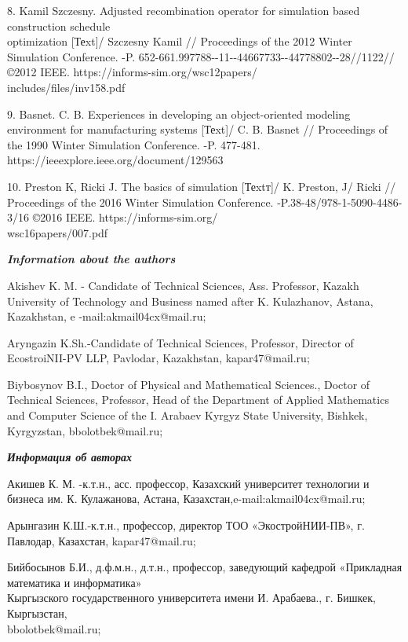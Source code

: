 \begin{noparindent}
8. Kamil Szczesny. Adjusted recombination operator for simulation based
construction schedule \\optimization {[}Теxt{]}/ Szczesny Kamil //
Proceedings of the 2012 Winter Simulation Conference. -P.
652-661.997788-\/-11-\/-44667733-\/-44778802-\/-28//1122//©2012 IEEE.
https://informs-sim.org/wsc12papers/\\includes/files/inv158.pdf

9. Basnet. C. B. Experiences in developing an object-oriented modeling
environment for manufacturing systems {[}Теxt{]}/ C. B. Basnet //
Proceedings of the 1990 Winter Simulation Conference. -P. 477-481.
https://ieeexplore.ieee.org/document/129563

10. Preston K, Ricki J. The basics of simulation {[}Теxtт{]}/ K.
Preston, J/ Ricki // Proceedings of the 2016 Winter Simulation
Conference. -P.38-48/978-1-5090-4486-3/16 ©2016 IEEE.
https://informs-sim.org/\\wsc16papers/007.pdf
\end{noparindent}

\emph{{\bfseries Information about the authors}}
\begin{noparindent}

Akishev K. M. - Candidate of Technical Sciences, Ass. Professor, Kazakh
University of Technology and Business named after K. Kulazhanov, Astana,
Kazakhstan, e -mail:akmail04cx@mail.ru;

Aryngazin K.Sh.-Candidate of Technical Sciences, Professor, Director of
EcostroiNII-PV LLP, Pavlodar, Kazakhstan, kapar47@mail.ru;

Biybosynov B.I., Doctor of Physical and Mathematical Sciences., Doctor
of Technical Sciences, Professor, Head of the Department of Applied
Mathematics and Computer Science of the I. Arabaev Kyrgyz State
University, Bishkek, Kyrgyzstan, bbolotbek@mail.ru;
\end{noparindent}

\emph{{\bfseries Информация об авторах}}
\begin{noparindent}

Акишев К. М. -к.т.н., асс. профессор, Казахский университет технологии и
бизнеса им. К. Кулажанова, Астана, Казахстан,e-mail:akmail04cx@mail.ru;

Арынгазин К.Ш.-к.т.н., профессор, директор ТОО «ЭкостройНИИ-ПВ», г.
Павлодар, Казахстан, kapar47@mail.ru;

Бийбосынов Б.И., д.ф.м.н., д.т.н., профессор, заведующий кафедрой
«Прикладная математика и информатика»\\ Кыргызского государственного
университета имени И. Арабаева., г. Бишкек, Кыргызстан,
\\bbolotbek@mail.ru;
\end{noparindent}
